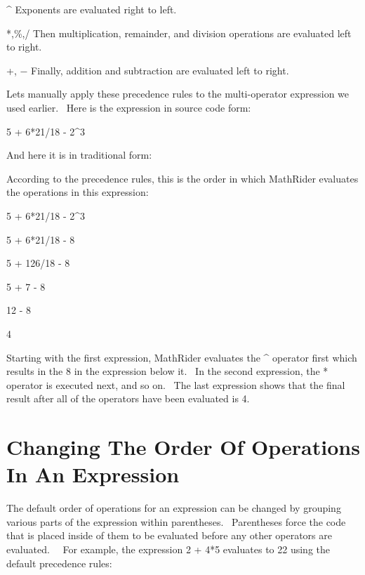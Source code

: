 \documentclass[12pt,twoside]{book}
\begin{document}
\bigskip

\^{} Exponents are evaluated right to left.


\bigskip

*,\%,/ Then multiplication, remainder, and division operations are evaluated left to right. 

\bigskip

+, $-$ Finally, addition and subtraction are evaluated left to right.


\bigskip

Lets manually apply these precedence rules to the multi{}-operator expression we used earlier. \ Here is the expression in source code form: 

\bigskip

5 + 6*21/18 {}- 2\^{}3


\bigskip

And here it is in traditional form:


\bigskip


\bigskip

According to the precedence rules, this is the order in which MathRider evaluates the operations in this expression: 

\bigskip

5 + 6*21/18 {}- 2\^{}3

5 + 6*21/18 {}- 8

5 + 126/18 {}- 8

5 + 7 {}- 8

12 {}- 8

4


\bigskip

Starting with the first expression, MathRider evaluates the \^{} operator first which results in the 8 in the expression below it. \ In the second expression, the * operator is executed next, and so on. \ The last expression shows that the final result after all of the operators have been evaluated is 4.

\section[Changing The Order Of Operations In An Expression]{Changing The Order Of Operations In An Expression}

The default order of operations for an expression can be changed by grouping various parts of the expression within parentheses. \ Parentheses force the code that is placed inside of them to be evaluated before any other operators are evaluated. \ \ For example, the expression 2 + 4*5 evaluates to 22 using the default precedence rules: 
\end{document}
